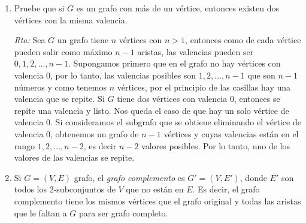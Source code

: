 \documentclass[a4paper,12pt,twoside,spanish,reqno]{amsbook}
\numberwithin{equation}{section}
\newcommand{\rta}{\noindent\textit{Rta: }}
\begin{document}
\begin{enumerate}
    

    \item Pruebe que si $G$ es un grafo con más de un vértice, entonces existen dos vértices con la misma valencia.
    
    \rta Sea $G$ un grafo tiene $n$ vértices con $n >1$, entonces como de cada vértice pueden salir como máximo $n-1$ aristas, las  valencias pueden ser $0, 1, 2,\ldots,n-1$. Supongamos primero que en el grafo  no hay vértices con valencia 0, por lo tanto, las valencias posibles son $1, 2,\ldots,n-1$ que son $n-1$ números y como tenemos $n$ vértices, por el principio de las casillas hay una valencia que se repite. Si $G$ tiene dos vértices con valencia 0, entonces se repite una valencia y listo. Nos queda el caso  de que hay un solo vértice de valencia 0. Si consideramos el subgrafo que se obtiene eliminando el vértice de valencia 0, obtenemos un grafo de $n-1$ vértices y cuyas valencias están en el rango $1, 2,\ldots,n-2$, es decir $n-2$ valores posibles. Por lo tanto, uno de los valores de las valencias se repite. 
    
    
    
    \item Si $G=(V,E)$ grafo,  el \textit{grafo complemento}  es $G' = (V,E')$, donde $E'$ son todos los 2-subconjuntos de $V$ que no están en $E$. Es decir, el grafo complemento tiene los mismos vértices que el grafo original y todas las aristas que le faltan a $G$ para ser grafo completo. 
\end{enumerate}
\end{document}
